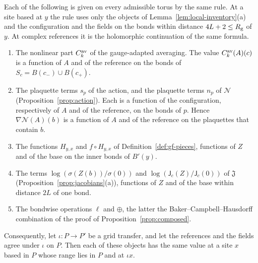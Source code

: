 \begin{lemma}\label{lem:gl-inventory}
Each of the following is given on every admissible torus by the same rule. At a site based at $y$ the rule uses only the objects of Lemma~\ref{lem:local-inventory}(a) and the configuration and the fields on the bonds within distance $4L+2\le R_{\rm g}$ of $y$. At complex references it is the holomorphic continuation of the same formula.
\begin{enumerate}[label=(\roman*)]
\item The nonlinear part $C^{\rm av}_k$ of the gauge-adapted averaging. The value $C^{\rm av}_k(A)(c)$ is a function of $A$ and of the reference on the bonds of $S_c=B(c_-)\cup B(c_+)$.
\item The plaquette terms $s_p$ of the action, and the plaquette terms $n_p$ of $\mathcal N$ (Proposition~\ref{prop:action}). Each is a function of the configuration, respectively of $A$ and of the reference, on the bonds of $p$. Hence $\nabla\mathcal N(A)(b)$ is a function of $A$ and of the reference on the plaquettes that contain $b$.
\item The functions $H_{y,x}$ and $f\circ H_{y,x}$ of Definition~\ref{def:gf-pieces}, functions of $Z$ and of the base on the inner bonds of $B'(y)$.
\item The terms $\log(\sigma(Z(b))/\sigma(0))$ and $\log(\mathsf J_c(Z)/\mathsf J_c(0))$ of $\mathfrak J$ (Proposition~\ref{prop:jacobians}(a)), functions of $Z$ and of the base within distance $2L$ of one bond.
\item The bondwise operations $\ell$ and $\oplus$, the latter the Baker--Campbell--Hausdorff combination of the proof of Proposition~\ref{prop:composed}.
\end{enumerate}
Consequently, let $\iota:P\to P'$ be a grid transfer, and let the references and the fields agree under $\iota$ on $P$. Then each of these objects has the same value at a site $x$ based in $P$ whose range lies in $P$ and at $\iota x$.
\end{lemma}


